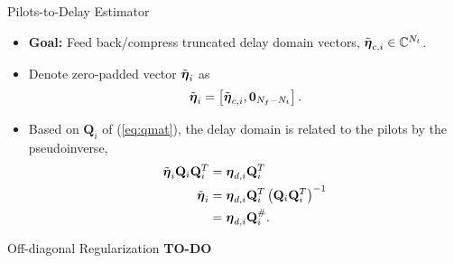 \documentclass{beamer}
\begin{document}
  \begin{frame}{Pilots-to-Delay Estimator}
    \begin{itemize}    
      \item \textbf{Goal:} Feed back/compress truncated delay domain vectors, $\tilde{\boldsymbol{\eta}}_{c,i}\in\mathbb{C}^{N_t}$.
      \item Denote zero-padded vector $\tilde{\boldsymbol{\eta}}_{i}$ as
      \begin{align} 
        \tilde{\boldsymbol{\eta}}_{i} = \left[\tilde{\boldsymbol{\eta}}_{c,i}, \mathbf{0}_{N_f - N_t}\right]. \label{eq:p2d_short}
      \end{align}
      \item Based on $\mathbf{Q}_i$ of (\ref{eq:qmat}), the delay domain is related to the pilots by the pseudoinverse,
      \begin{align}
        \tilde{\boldsymbol{\eta}}_{i}\mathbf{Q}_i\mathbf{Q}_i^T &= \boldsymbol{\eta}_{d,i}\mathbf{Q}_i^T \nonumber \\
        \tilde{\boldsymbol{\eta}}_{i} &= \boldsymbol{\eta}_{d,i}\mathbf{Q}_i^T\left(\mathbf{Q}_i\mathbf{Q}_i^T\right)^{-1} \nonumber \\
        &= \boldsymbol{\eta}_{d,i}\mathbf{Q}_i^{\#}. \label{eq:p2d}
      \end{align}
    \end{itemize}
  \end{frame}

  \begin{frame}{Off-diagonal Regularization}
  \textbf{TO-DO}
  \end{frame}
\end{document}
